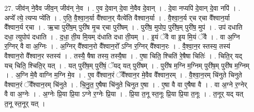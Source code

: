 \documentclass[17pt]{extarticle}
\begin{document}
27. जीव॑न् ने॒वैव जीव॒न् जीव॑न् ने॒व । . ए॒व दे॒वान् दे॒वा ने॒वैव दे॒वान् । . दे॒वा नप्यपि॑ दे॒वान् दे॒वा नपि॑ । . अप्ये᳚ त्ये॒ त्यप्य प्ये॑ति । . ए॒ति॒ वै॒श्वा॒न॒र्या वै᳚श्वान॒र् यैत्ये॑ति वैश्वान॒र्या । . वै॒श्वा॒न॒र्य र्‌च र्‌चा वै᳚श्वान॒र्या वै᳚श्वान॒र्य र्‌चा । . ऋ॒चा पुरी॑ष॒म् पुरी॑ष मृ॒च र्‌चा पुरी॑षम् । . पुरी॑ष॒ मुपोप॒ पुरी॑ष॒म् पुरी॑ष॒ मुप॑ । . उप॑ दधाति दधा॒ त्युपोप॑ दधाति । . द॒धा॒ ती॒य मि॒यम् द॑धाति दधा ती॒यम् । . इ॒यं ॅवै वा इ॒य मि॒यं ॅवै । . वा अ॒ग्नि र॒ग्निर् वै वा अ॒ग्निः । . अ॒ग्निर् वै᳚श्वान॒रो वै᳚श्वान॒रो᳚ ऽग्नि र॒ग्निर् वै᳚श्वान॒रः । . वै॒श्वा॒न॒र स्तस्य॒ तस्य॑ वैश्वान॒रो वै᳚श्वान॒र स्तस्य॑ । . तस्यै॒ षैषा तस्य॒ तस्यै॒षा । . ए॒षा चिति॒ श्चिति॑ रे॒षैषा चितिः॑ । . चिति॒र् यद् यच् चिति॒ श्चिति॒र् यत् । . यत् पुरी॑ष॒म् पुरी॑षं॒ ॅयद् यत् पुरी॑षम् । . पुरी॑ष म॒ग्नि म॒ग्निम् पुरी॑ष॒म् पुरी॑ष म॒ग्निम् । . अ॒ग्नि मे॒वै वाग्नि म॒ग्नि मे॒व । . ए॒व वै᳚श्वान॒रं ॅवै᳚श्वान॒र मे॒वैव वै᳚श्वान॒रम् । . वै॒श्वा॒न॒रम् चि॑नुते चिनुते वैश्वान॒रं ॅवै᳚श्वान॒रम् चि॑नुते । . चि॒नु॒त॒ ए॒षैषा चि॑नुते चिनुत ए॒षा । . ए॒षा वै वा ए॒षैषा वै । . वा अ॒ग्ने र॒ग्नेर् वै वा अ॒ग्नेः । . अ॒ग्नेः प्रि॒या प्रि॒या ऽग्ने र॒ग्नेः प्रि॒या । . प्रि॒या त॒नू स्त॒नूः प्रि॒या प्रि॒या त॒नूः । . त॒नूर् यद् यत् त॒नू स्त॒नूर् यत् । \newline
\end{document}
